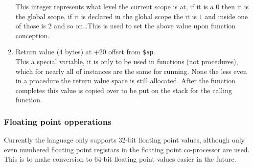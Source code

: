 \documentclass{article}
\begin{document}
\begin{enumerate}
This integer represents what level the current scope is at, if it is a $0$ then it is the global scope, if it is declared in the global scope the it is $1$ and inside one of those is $2$ and so on\ldots This is used to set the above value upon function conception.
\item Return value (4 bytes) at +20 offset from \texttt{\$sp}. \\
This a special variable, it is only to be used in functions (not procedures), which for nearly all of instances are the same for running. None the less even in a procedure the return value space is still allocated. After the function completes this value is copied over to be put on the stack for the calling function.
\end{enumerate}

\subsubsection{Floating point opperations}
Currently the language only supports 32-bit floating point values, although only even numbered floating point registars in the floating point co-processor are used. This is to make conversion to 64-bit floating point values easier in the future. 
\end{document}
